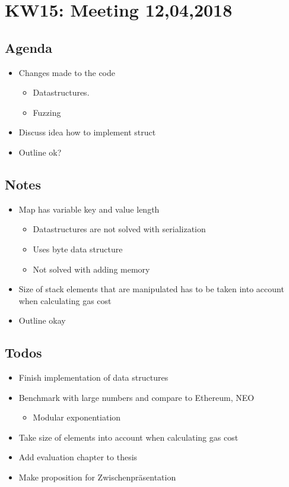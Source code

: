 \section{KW15: Meeting 12,04,2018}
\subsection{Agenda}

\begin{itemize}
\item
  Changes made to the code

  \begin{itemize}
  \item
    Datastructures.
  \item
    Fuzzing
  \end{itemize}
\item
  Discuss idea how to implement struct
\item
  Outline ok?
\end{itemize}

\subsection{Notes}

\begin{itemize}
\item
  Map has variable key and value length

  \begin{itemize}
  \item
    Datastructures are not solved with serialization
  \item
    Uses byte data structure
  \item
    Not solved with adding memory
  \end{itemize}
\item
  Size of stack elements that are manipulated has to be taken into
  account when calculating gas cost
\item
  Outline okay
\end{itemize}

\subsection{Todos}

\begin{itemize}
\item
  Finish implementation of data structures
\item
  Benchmark with large numbers and compare to Ethereum, NEO

  \begin{itemize}
  \item
    Modular exponentiation
  \end{itemize}
\item
  Take size of elements into account when calculating gas cost
\item
  Add evaluation chapter to thesis
\item
  Make proposition for Zwischenpräsentation
\end{itemize}


